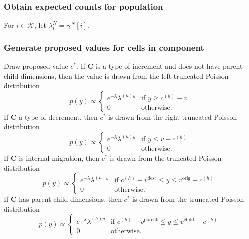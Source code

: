 \documentclass{article}
\begin{document}
\subsubsection{Obtain expected counts for population}

For $i \in \mathcal{K}$, let $\lambda_i^N = \bm{\gamma}^N[i]$.

\subsubsection{Generate proposed values for cells in component}

Draw proposed value $c^*$. If $\bm{C}$ is a type of increment and does not have parent-child dimensions, then the value is drawn from the left-truncated Poisson distribution 
    \begin{equation}
       p(y) \propto
       \begin{cases}
          e^{-\lambda} \lambda^{(h)y} & \text{if } y \geq c^{(h)} - v \\
          0 & \text{otherwise.} 
      \end{cases}
    \end{equation}
  If $\bm{C}$ a type of decrement, then $c^*$ is drawn from the right-truncated Poisson distribution 
    \begin{equation}
       p(y) \propto
       \begin{cases}
          e^{-\lambda} \lambda^{(h)y} & \text{if } y \leq v - c^{(h)} \\
          0 & \text{otherwise.} 
      \end{cases}
    \end{equation}
  If $\bm{C}$ is internal migration, then $c^*$ is drawn from the truncated Poisson distribution 
    \begin{equation}
       p(y) \propto
       \begin{cases}
          e^{-\lambda} \lambda^{(h)y} & \text{if } c^{(h)} - v^{\text{dest}} \leq y \leq v^{\text{orig}} - c^{(h)} \\
          0 & \text{otherwise.} 
      \end{cases}
    \end{equation}
  If $\bm{C}$ has parent-child dimensions, then $c^*$ is drawn from the truncated Poisson distribution 
    \begin{equation}
       p(y) \propto
       \begin{cases}
          e^{-\lambda} \lambda^{(h)y} & \text{if } c^{(h)} - v^{\text{parent}} \leq y \leq v^{\text{child}} - c^{(h)} \\
          0 & \text{otherwise.}
      \end{cases}
    \end{equation}
\end{document}
